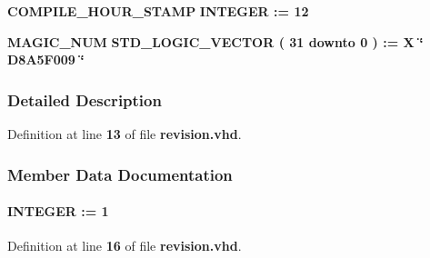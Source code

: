 \begin{DoxyCompactItemize}
{\bf C\+O\+M\+P\+I\+L\+E\+\_\+\+H\+O\+U\+R\+\_\+\+S\+T\+A\+MP} {\bfseries \textcolor{comment}{I\+N\+T\+E\+G\+ER}\textcolor{vhdlchar}{ }\textcolor{vhdlchar}{ }\textcolor{vhdlchar}{\+:}\textcolor{vhdlchar}{=}\textcolor{vhdlchar}{ }\textcolor{vhdlchar}{ } \textcolor{vhdldigit}{12} \textcolor{vhdlchar}{ }} 
\item 
{\bf M\+A\+G\+I\+C\+\_\+\+N\+UM} {\bfseries \textcolor{comment}{S\+T\+D\+\_\+\+L\+O\+G\+I\+C\+\_\+\+V\+E\+C\+T\+OR}\textcolor{vhdlchar}{ }\textcolor{vhdlchar}{(}\textcolor{vhdlchar}{ }\textcolor{vhdlchar}{ } \textcolor{vhdldigit}{31} \textcolor{vhdlchar}{ }\textcolor{keywordflow}{downto}\textcolor{vhdlchar}{ }\textcolor{vhdlchar}{ } \textcolor{vhdldigit}{0} \textcolor{vhdlchar}{ }\textcolor{vhdlchar}{)}\textcolor{vhdlchar}{ }\textcolor{vhdlchar}{ }\textcolor{vhdlchar}{ }\textcolor{vhdlchar}{\+:}\textcolor{vhdlchar}{=}\textcolor{vhdlchar}{ }\textcolor{vhdlchar}{ }\textcolor{vhdlchar}{X}\textcolor{vhdlchar}{ }\textcolor{keyword}{\char`\"{} D8\+A5\+F009 \char`\"{}}\textcolor{vhdlchar}{ }} 
\end{DoxyCompactItemize}


\subsubsection{Detailed Description}


Definition at line {\bf 13} of file {\bf revision.\+vhd}.



\subsubsection{Member Data Documentation}
\paragraph[{B\+E\+T\+A\+\_\+\+R\+EV}]{ {\bfseries \textcolor{comment}{I\+N\+T\+E\+G\+ER}\textcolor{vhdlchar}{ }\textcolor{vhdlchar}{ }\textcolor{vhdlchar}{\+:}\textcolor{vhdlchar}{=}\textcolor{vhdlchar}{ }\textcolor{vhdlchar}{ } \textcolor{vhdldigit}{1} \textcolor{vhdlchar}{ }} \hspace{0.3cm}{\ttfamily [Constant]}}\label{classrevisions_a61cc0e8f97adeaa9e7ed58f09802a984}


Definition at line {\bf 16} of file {\bf revision.\+vhd}.

